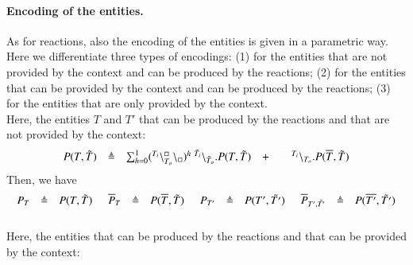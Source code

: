 \paragraph{Encoding of the entities.}
As for reactions, also the encoding of the entities is given in a parametric way.
Here we differentiate three types of encodings: (1) for the entities that are not  provided by the context and  can be produced by the reactions; (2) for the entities that can be provided by the context and can be  produced by the reactions; (3) for the entities that are only provided by the context.\\
Here, the entities $T$ and $T'$ that can be produced by the reactions and that are not provided by the context:
\[
\begin{array}{lcllcl}
P (T,\tilde{T})&\triangleq & \sum_{h=0}^1 ({}^{T_i}\backslash_{T_o}^{\scriptstyle {\square}}\backslash_{\scriptstyle {\square}})^h\ {}^{\tilde{T}_i} \backslash_{\tilde{T}_o}.P (T,\tilde{T})
& +  && {}^{T_i} \backslash_{T_o}.P (\overline{T},\tilde{T}) \\
\end{array}
\]
Then, we have
\[
\begin{array}{lcl @{\hspace{0.5cm}}lcl @{\hspace{0.5cm}}lcl @{\hspace{0.5cm}}lcl}
P_T & \defeq & P(T,\tilde{T})& \overline{P}_T & \defeq & P(\overline{T},\tilde{T}) & P_{T'}& \defeq & P(T',\tilde{T'}) & \overline{P}_{T',\tilde{T'}}& \defeq & P(\overline{T'},\tilde{T'})\\\
\end{array}
\]
Here, the entities that can be produced by the reactions and that can be  provided by the context:
